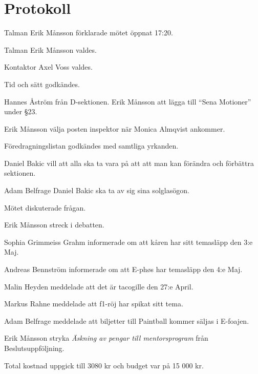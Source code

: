 \documentclass[10pt]{article}
\def\mo{Erik Månsson}
\def\ms{Axel Voss}
\begin{document}
\section*{Protokoll}
\begin{paragrafer}
	Talman {\mo} förklarade mötet öppnat 17:20.

	Talman {\mo} valdes.

	Kontaktor {\ms} valdes.

	Tid och sätt godkändes.

	\valavj

	Hannes Åström från D-sektionen.
	Erik Månsson \ypa att lägga till ``Sena Motioner'' under \S23.

	Erik Månsson \ypa välja posten inspektor när Monica Almqvist ankommer.

	Föredragningslistan godkändes med samtliga yrkanden.


	Daniel Bakic vill att alla ska ta vara på att att man kan förändra och förbättra sektionen.

	Adam Belfrage \ypa Daniel Bakic ska ta av sig sina solglasögon.

	Mötet diskuterade frågan.

	Erik Månsson \ypa streck i debatten.

	\Mbabay

	Sophia Grimmeiss Grahm informerade om att kåren har sitt temasläpp den 3:e Maj.

	Andreas Bennström informerade om att E-phøs har temasläpp den 4:e Maj.

	Malin Heyden meddelade att det är tacogille den 27:e April.

	Markus Rahne meddelade att f1-röj har spikat sitt tema.

	Adam Belfrage meddelade att biljetter till Paintball kommer säljas i E-foajen.


	Erik Månsson \ypa stryka \emph{Äskning av pengar
		till mentorsprogram} från Beslutsuppföljning.

	Total kostnad uppgick till 3080 kr och budget var på 15 000 kr.


\end{paragrafer}
\end{document}
